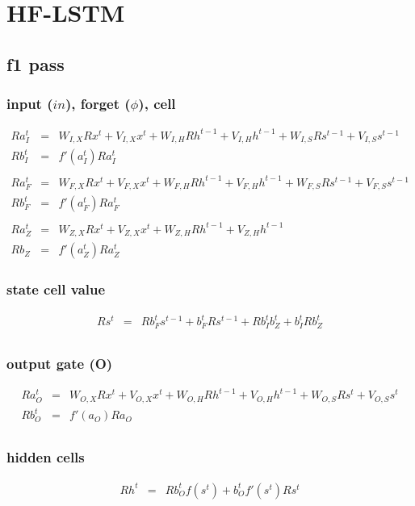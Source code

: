 \documentclass{article}
\begin{document}
\section{HF-LSTM}

\subsection{f1 pass}

\subsubsection{input ($in$), forget ($\phi$), cell}
\begin{eqnarray*}
Ra_{I}^t &=& W_{I,X}Rx^t + V_{I,X}x^t + W_{I,H}Rh^{t-1} + V_{I,H}h^{t-1} + W_{I,S}Rs^{t-1} + V_{I,S}s^{t-1}\\
Rb_{I}^t &=& f'(a_{I}^t)Ra_{I}^t \\
\\
Ra_{F}^t &=& W_{F,X}Rx^t + V_{F,X}x^t + W_{F, H}Rh^{t-1} + V_{F, H}h^{t-1} + W_{F, S}Rs^{t-1} + V_{F, S}s^{t-1} \\
Rb_{F}^t &=& f'(a_{F}^t) Ra_{F}^t \\
\\
Ra_{Z}^t &=& W_{Z,X}Rx^t + V_{Z,X}x^t + W_{Z,H} Rh^{t-1} + V_{Z,H} h^{t-1} \\
Rb_{Z} &=& f'(a_{Z}^t) Ra_{Z}^t 
\end{eqnarray*}


\subsubsection{state cell value}
\begin{eqnarray*}
Rs^t &=& Rb_{F}^ts^{t-1} + b_{F}^tRs^{t-1} + Rb_{I}^t b_Z^t + b_{I}^t Rb_Z^t \\  
\end{eqnarray*}

\subsubsection{output gate (O)}
\begin{eqnarray*}
Ra_{O}^t &=& W_{O,X}Rx^t + V_{O,X}x^t + W_{O,H}Rh^{t-1} + V_{O,H}h^{t-1} + W_{O,S}Rs^t + V_{O,S}s^t \\
Rb_{O}^t &=& f'(a_{O})Ra_{O} \\
\end{eqnarray*}

\subsubsection{hidden cells}
\begin{eqnarray*}
Rh^t &=& Rb_{O}^t f(s^t) + b_{O}^t f'(s^t)Rs^t \\
\end{eqnarray*}
\end{document}
